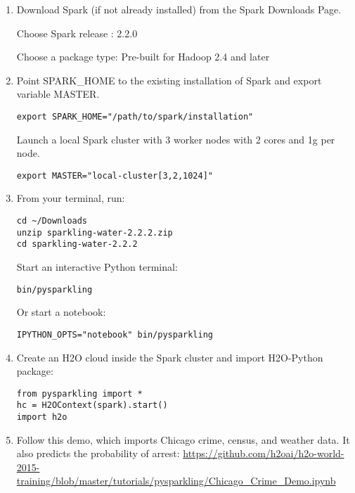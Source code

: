 \begin{enumerate}
\item Download Spark (if not already installed) from the Spark Downloads Page.

Choose Spark release : 2.2.0

Choose a package type: Pre-built for Hadoop 2.4 and later

\item Point SPARK\_HOME to the existing installation of Spark and export variable MASTER.

\begin{lstlisting}[style=Bash]
export SPARK_HOME="/path/to/spark/installation" 
\end{lstlisting}

Launch a local Spark cluster with 3 worker nodes with 2 cores and 1g per node.
\begin{lstlisting}[style=Bash]
export MASTER="local-cluster[3,2,1024]" 
\end{lstlisting}

\item From your terminal, run:

\begin{lstlisting}[style=Bash]
cd ~/Downloads
unzip sparkling-water-2.2.2.zip
cd sparkling-water-2.2.2
\end{lstlisting}

Start an interactive Python terminal:
\begin{lstlisting}[style=Bash]
bin/pysparkling
\end{lstlisting}

Or start a notebook:
\begin{lstlisting}[style=Bash]
IPYTHON_OPTS="notebook" bin/pysparkling
\end{lstlisting}

\item Create an H2O cloud inside the Spark cluster and import H2O-Python package:

\begin{lstlisting}[style=Scala]
from pysparkling import *
hc = H2OContext(spark).start()
import h2o
\end{lstlisting}

\item Follow this demo, which imports Chicago crime, census, and weather data. It also predicts the probability of arrest:
 \url{https://github.com/h2oai/h2o-world-2015-training/blob/master/tutorials/pysparkling/Chicago_Crime_Demo.ipynb}

\end{enumerate}

